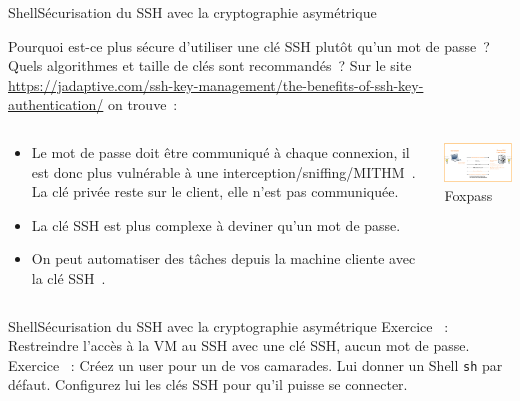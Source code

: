 \documentclass{beamer}
\begin{document}
    \begin{frame}{Shell}{Sécurisation du SSH avec la cryptographie asymétrique}
        \begin{small}
            Pourquoi est-ce plus sécure d'utiliser une clé SSH plutôt qu'un mot de passe~?
            \bigbreak
            Quels algorithmes et taille de clés sont recommandés~?
            \pause
            \bigbreak
            Sur le site \url{https://jadaptive.com/ssh-key-management/the-benefits-of-ssh-key-authentication/} on trouve~:
            \begin{columns}
                \begin{column}{0.6\textwidth}
                    \begin{itemize}
                        \item Le mot de passe doit être communiqué à chaque connexion, il est donc plus vulnérable à une interception/sniffing/MITHM~.
                        La clé privée reste sur le client, elle n'est pas communiquée.
                        \item La clé SSH est plus complexe à deviner qu'un mot de passe.
                        \item On peut automatiser des tâches depuis la machine cliente avec la clé SSH~.
                    \end{itemize}
                \end{column}
                \begin{column}{0.4\textwidth}
                    \centering
                    \includegraphics[width=5cm]{image/ssh-key-diagram} \\ Foxpass\footnotemark \\
                \end{column}
            \end{columns}
        \end{small}
    \end{frame}

    \begin{frame}{Shell}{Sécurisation du SSH avec la cryptographie asymétrique}
        Exercice \execcounterdispinc{}~:
        Restreindre l'accès à la VM au SSH avec une clé SSH, aucun mot de passe.
        \bigbreak
        Exercice \execcounterdispinc{}~:
        Créez un user pour un de vos camarades.
        Lui donner un Shell \lstinline{sh} par défaut.
        Configurez lui les clés SSH pour qu'il puisse se connecter.
    \end{frame}
\end{document}
